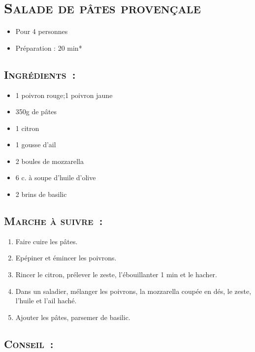 \section[\normalsize{Salade de p\^ates provençale}]{\LARGE{\textsc{Salade de p\^ates provençale}}}		%


\begin{itemize}
\item Pour 4 personnes
\item Préparation : 20 min*
\end{itemize}

\subsection*{\textsc{Ingr\'edients~:}}

\begin{itemize}
\item 1 poivron rouge;1 poivron jaune
\item 350g de p\^ates
\item 1 citron
\item 1 gousse d'ail
\item 2 boules de mozzarella
\item 6 c. \`a soupe d'huile d'olive
\item 2 brins de basilic
\end{itemize}


\subsection*{\textsc{Marche \`a suivre~:}}

\begin{enumerate}

\item Faire cuire les p\^ates.

\item Ep\'epiner et \'emincer les poivrons.
 
\item Rincer le citron, pr\'elever le zeste, l'\'ebouillanter 1 min et le hacher.

\item Dans un saladier, m\'elanger les poivrons, la mozzarella coup\'ee en d\'es, le zeste, l'huile et l'ail hach\'e.

\item Ajouter les p\^ates, parsemer de basilic.

\end{enumerate}
\subsection*{\textsc{Conseil~:}}

